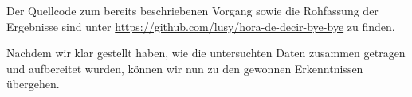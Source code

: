 
Der Quellcode zum bereits beschriebenen Vorgang sowie die Rohfassung der Ergebnisse sind unter \url{https://github.com/lusy/hora-de-decir-bye-bye} zu finden.

Nachdem wir klar gestellt haben, wie die untersuchten Daten zusammen getragen und aufbereitet wurden, können wir nun zu den gewonnen Erkenntnissen übergehen.


